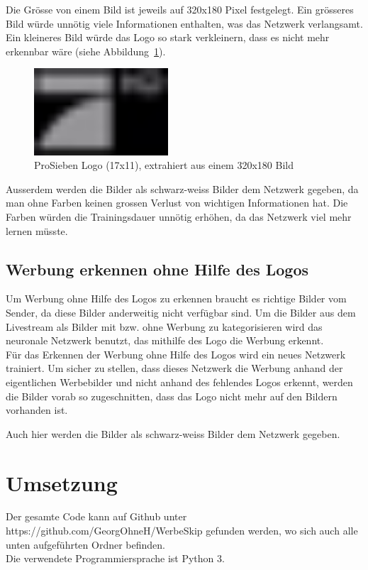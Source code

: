 \documentclass[12pt,a4paper]{report}
\begin{document}
Die Grösse von einem Bild ist jeweils auf 320x180 Pixel festgelegt.
Ein grösseres Bild würde unnötig viele Informationen enthalten,
was das Netzwerk verlangsamt.
Ein kleineres Bild würde das Logo so stark verkleinern, dass es nicht mehr erkennbar wäre (siehe Abbildung~\ref{fig:logo6}).
\begin{figure}[h]%
    \centering
    \includegraphics[width=5cm]{assets/images/logo17x11.png}%
    \caption{ProSieben Logo (17x11), extrahiert aus einem 320x180 Bild}%
    \label{fig:logo6}%
\end{figure}

Ausserdem werden die Bilder als schwarz-weiss Bilder dem Netzwerk gegeben,
da man ohne Farben keinen grossen Verlust von wichtigen Informationen hat.
Die Farben würden die Trainingsdauer unnötig erhöhen,
da das Netzwerk viel mehr lernen müsste.
\section{Werbung erkennen ohne Hilfe des Logos}
Um Werbung ohne Hilfe des Logos zu erkennen braucht es richtige Bilder vom Sender, da diese Bilder anderweitig nicht verfügbar sind.
Um die Bilder aus dem Livestream als Bilder mit bzw. ohne Werbung zu kategorisieren wird das neuronale Netzwerk benutzt, das mithilfe des Logo die Werbung erkennt.\bigskip\\
Für das Erkennen der Werbung ohne Hilfe des Logos wird ein neues Netzwerk trainiert.
Um sicher zu stellen, dass dieses Netzwerk die Werbung anhand der eigentlichen Werbebilder und nicht anhand des fehlendes Logos erkennt,
werden die Bilder vorab so zugeschnitten, dass das Logo nicht mehr auf den Bildern vorhanden ist.

Auch hier werden die Bilder als schwarz-weiss Bilder dem Netzwerk gegeben.


\chapter{Umsetzung}
\label{ch:umsetzung}
Der gesamte Code kann auf Github unter https://github.com/GeorgOhneH/WerbeSkip gefunden werden, wo sich auch alle unten aufgeführten Ordner befinden.\bigskip\\
Die verwendete Programmiersprache ist Python 3\cite{python}.
\end{document}
